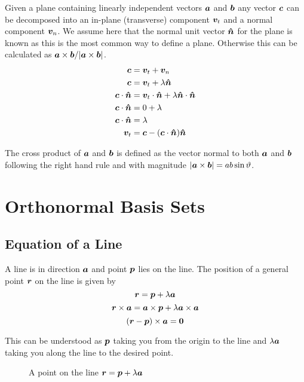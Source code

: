 \documentclass{article}
\begin{document}
    Given a plane containing linearly independent vectors \(\bm{a}\) and \(\bm{b}\) any vector \(\bm{c}\) can be decomposed into an in-plane (transverse) component \(\bm{v}_t\) and a normal component \(\bm{v}_n\). We assume here that the normal unit vector \(\bm{\hat{n}}\) for the plane is known as this is the most common way to define a plane. Otherwise this can be calculated as \(\bm{a}\times\bm{b}/|\bm{a}\times\bm{b}|\).
    \begin{align*}
        \bm{c} &= \bm{v}_t + \bm{v}_n\\
        \bm{c} &= \bm{v}_t + \lambda\bm{\hat{n}}\\
        \bm{c}\cdot\bm{\hat{n}} &= \bm{v}_t\cdot\bm{\hat{n}} + \lambda\bm{\hat{n}}\cdot\bm{\hat{n}}\\
        \bm{c}\cdot\bm{\hat{n}} &= 0 + \lambda\\
        \bm{c}\cdot\bm{\hat{n}} &= \lambda\\
        \bm{v}_t &= \bm{c} -(\bm{c}\cdot\bm{\hat{n}})\bm{\hat{n}}
    \end{align*}
    
    The cross product of \(\bm{a}\) and \(\bm{b}\) is defined as the vector normal to both \(\bm{a}\) and \(\bm{b}\) following the right hand rule and with magnitude \(|\bm{a}\times\bm{b}|=ab\sin\vartheta\).
    
    \section{Orthonormal Basis Sets}
    \subsection{Equation of a Line}
    A line is in direction \(\bm{a}\) and point \(\bm{p}\) lies on the line. 
    The position of a general point \(\bm{r}\) on the line is given by
    \[\bm{r} = \bm{p} +\lambda \bm{a}\]
    \[\bm{r}\times\bm{a}=\bm{a}\times\bm{p}+\lambda\bm{a}\times\bm{a}\]
    \[(\bm{r}-\bm{p})\times\bm{a}=\bm{0}\]
    
    This can be understood as \(\bm{p}\) taking you from the origin to the line and \(\lambda\bm{a}\) taking you along the line to the desired point.
    
    \begin{figure}[ht]
        \centering
        \caption{A point on the line \(\bm{r} = \bm{p} + \lambda \bm{a}\)}
    \end{figure}
\end{document}
